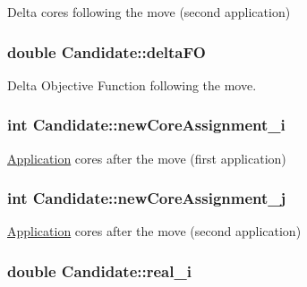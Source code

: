 Delta cores following the move (second application) 

\hypertarget{classCandidate_a1bfc07aae3b3914bba57e057936399e7}{
\subsubsection[{delta\-F\-O}]{\setlength{\rightskip}{0pt plus 5cm}double Candidate\-::delta\-F\-O}}\label{classCandidate_a1bfc07aae3b3914bba57e057936399e7}


Delta Objective Function following the move. 

\hypertarget{classCandidate_a859313416296683b7c0496d842dab48a}{
\subsubsection[{new\-Core\-Assignment\-\_\-i}]{\setlength{\rightskip}{0pt plus 5cm}int Candidate\-::new\-Core\-Assignment\-\_\-i}}\label{classCandidate_a859313416296683b7c0496d842dab48a}


\hyperlink{classApplication}{Application} cores after the move (first application) 

\hypertarget{classCandidate_a1203966358bd849169b5f967de3c2bf7}{
\subsubsection[{new\-Core\-Assignment\-\_\-j}]{\setlength{\rightskip}{0pt plus 5cm}int Candidate\-::new\-Core\-Assignment\-\_\-j}}\label{classCandidate_a1203966358bd849169b5f967de3c2bf7}


\hyperlink{classApplication}{Application} cores after the move (second application) 

\hypertarget{classCandidate_a93a050a3128d98f446176d9411535eea}{
\subsubsection[{real\-\_\-i}]{\setlength{\rightskip}{0pt plus 5cm}double Candidate\-::real\-\_\-i}}\label{classCandidate_a93a050a3128d98f446176d9411535eea}


